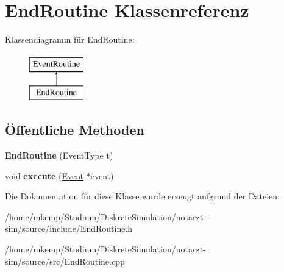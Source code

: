 \hypertarget{classEndRoutine}{}\section{End\+Routine Klassenreferenz}
\label{classEndRoutine}
Klassendiagramm für End\+Routine\+:\begin{figure}[H]
\begin{center}
\leavevmode
\includegraphics[height=2.000000cm]{classEndRoutine}
\end{center}
\end{figure}
\subsection*{Öffentliche Methoden}
\begin{DoxyCompactItemize}
\item 
{\bfseries End\+Routine} (Event\+Type t)\hypertarget{classEndRoutine_af6bdd3a9c499fcb62ebdd24758763eb8}{}\label{classEndRoutine_af6bdd3a9c499fcb62ebdd24758763eb8}

\item 
void {\bfseries execute} (\hyperlink{classEvent}{Event} $\ast$event)\hypertarget{classEndRoutine_a147e1143dfec1d3fb4a58d3a6efd6641}{}\label{classEndRoutine_a147e1143dfec1d3fb4a58d3a6efd6641}

\end{DoxyCompactItemize}


Die Dokumentation für diese Klasse wurde erzeugt aufgrund der Dateien\+:\begin{DoxyCompactItemize}
\item 
/home/mkemp/\+Studium/\+Diskrete\+Simulation/notarzt-\/sim/source/include/End\+Routine.\+h\item 
/home/mkemp/\+Studium/\+Diskrete\+Simulation/notarzt-\/sim/source/src/End\+Routine.\+cpp\end{DoxyCompactItemize}
